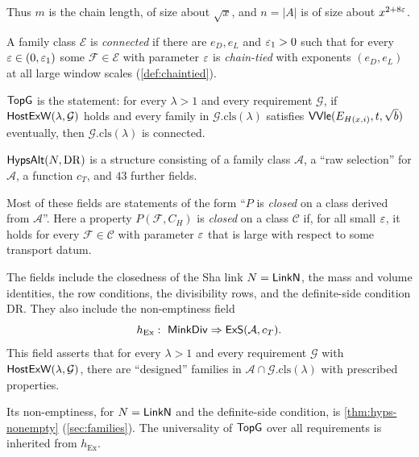 Thus $m$ is the chain length, of size about $\sqrt x$, and $n=|A|$ is of size about $x^{2+8\varepsilon}$.

\begin{definition}\label{def:topg}
A family class $\mathcal E$ is \emph{connected} if there are $e_D,e_L$ and $\varepsilon_1>0$ such that for
every $\varepsilon\in(0,\varepsilon_1)$ some $\mathcal F\in\mathcal E$ with parameter $\varepsilon$ is \emph{chain-tied}
with exponents $(e_D,e_L)$ at all large window scales (\cref{def:chaintied}).

$\mathsf{TopG}$ is the statement: for every $\lambda>1$ and every requirement $\mathcal G$, if
$\mathsf{HostExW}(\lambda,\mathcal G)$ holds and every family in $\mathcal G.\mathrm{cls}(\lambda)$
satisfies $\mathsf{VVle}(E_{H(x,i)},t,\sqrt{b})$ eventually, then $\mathcal G.\mathrm{cls}(\lambda)$
is connected. 
\end{definition}

\begin{definition}\label{def:hyps}
$\mathsf{HypsAlt}(N,\mathrm{DR})$ is a structure consisting of a family class $\mathcal A$, a ``raw
selection'' for $\mathcal A$, a function $c_T$, and $43$ further fields.

Most of these fields are statements of the form ``$P$ is \emph{closed} on a class derived from
$\mathcal A$''. Here a property $P(\mathcal F,C_H)$ is \emph{closed} on a class $\mathcal C$ if, for
all small $\varepsilon$, it holds for every $\mathcal F\in\mathcal C$ with parameter $\varepsilon$ that is large
with respect to some transport datum.

The fields include the closedness of the Sha link $N=\mathsf{LinkN}$, the mass and volume identities,
the row conditions, the divisibility rows, and the definite-side condition $\mathrm{DR}$. They also
include the non-emptiness field
\[
h_{\mathrm{Ex}}:\ \sfname{MinkDiv}\Rightarrow\sfname{ExS}(\mathcal A,c_T).
\]
This field asserts that for every $\lambda>1$ and every requirement $\mathcal G$ with
$\mathsf{HostExW}(\lambda,\mathcal G)$, there are ``designed'' families in
$\mathcal A\cap\mathcal G.\mathrm{cls}(\lambda)$ with prescribed properties.
\end{definition}

Its non-emptiness, for $N=\mathsf{LinkN}$ and the definite-side condition, is
\cref{thm:hyps-nonempty} (\cref{sec:families}). The universality of $\mathsf{TopG}$ over all
requirements is inherited from $h_{\mathrm{Ex}}$.

